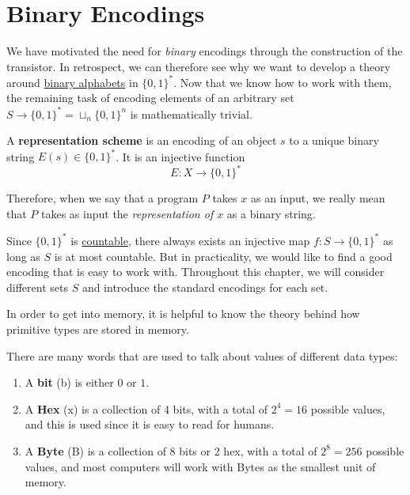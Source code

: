 \section{Binary Encodings} 
  
  We have motivated the need for \textit{binary} encodings through the construction of the transistor. In retrospect, we can therefore see why we want to develop a theory around \hyperref[th-binary_motivation]{binary alphabets} in $\{0, 1\}^\ast$. Now that we know how to work with them, the remaining task of encoding elements of an arbitrary set $S \to \{0, 1\}^\ast = \sqcup_n \{0, 1\}^n$ is mathematically trivial. 

  \begin{definition}
    \label{def:representation-scheme}
    A \textbf{representation scheme} is an encoding of an object $s$ to a unique binary string $E(s) \in \{0,1\}^\ast$. It is an injective function 
    \begin{equation}
      E: X \to \{0,1\}^\ast
    \end{equation}
  \end{definition}

  Therefore, when we say that a program $P$ takes $x$ as an input, we really mean that $P$ takes as input the \textit{representation of $x$} as a binary string.  

  Since $\{0, 1\}^\ast$ is \hyperref[st-def:countable]{countable}, there always exists an injective map $f: S \to \{0, 1\}^\ast$ as long as $S$ is at most countable. But in practicality, we would like to find a good encoding that is easy to work with. Throughout this chapter, we will consider different sets $S$ and introduce the standard encodings for each set. 

  In order to get into memory, it is helpful to know the theory behind how primitive types are stored in memory.  

  \begin{definition}
    \label{def:collections-of-bits}
    There are many words that are used to talk about values of different data types: 
    \begin{enumerate}
      \item A \textbf{bit} (b) is either $0$ or $1$. 
      \item A \textbf{Hex} (x) is a collection of 4 bits, with a total of $2^4 = 16$ possible values, and this is used since it is easy to read for humans. 
      \item A \textbf{Byte} (B) is a collection of 8 bits or 2 hex, with a total of $2^8 = 256$ possible values, and most computers will work with Bytes as the smallest unit of memory. 
    \end{enumerate}
  \end{definition}

